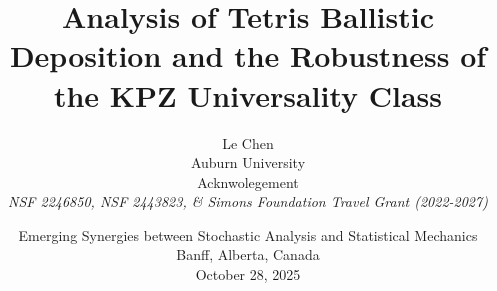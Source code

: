   \title{Analysis of Tetris Ballistic Deposition and the Robustness of the KPZ Universality Class}%

\author{Le Chen\\
  Auburn University\\[2em]
  \footnotesize Acknwolegement\\[0.5em]
  \textit{NSF 2246850, NSF 2443823, \& Simons Foundation Travel Grant (2022-2027)}\\[-0.3em]
}

\date[Banff]{
{\small Emerging Synergies between Stochastic Analysis and Statistical Mechanics} \\
{\small Banff, Alberta, Canada} \\
{\small October 28, 2025}
}






